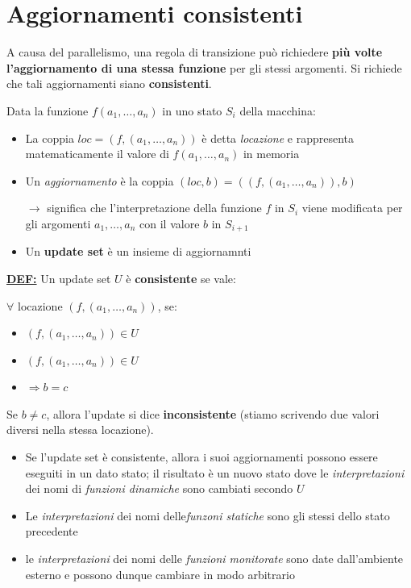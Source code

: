 \section{Aggiornamenti consistenti}
A causa del parallelismo, una regola di transizione può richiedere 
\textbf{più volte l'aggiornamento di una stessa funzione} per gli 
stessi argomenti. Si richiede che tali aggiornamenti siano \textbf{consistenti}.

\noindent Data la funzione $f(a_1, \dots, a_n)$ in uno stato $S_i$ della macchina:
\begin{itemize}
    \item La coppia $loc = (f, (a_1, \dots, a_n))$ è detta \textit{locazione} e rappresenta
    matematicamente il valore di $f(a_1, \dots, a_n)$ in memoria 
    \item Un \textit{aggiornamento} è la coppia $(loc, b)=((f,(a_1,\dots,a_n)), b)$
    
    $\rightarrow$ significa che l'interpretazione della funzione $f$ in $S_i$ viene modificata 
    per gli argomenti $a_1, \dots, a_n$ con il valore $b$ in $S_{i+1}$
    \item Un \textbf{update set} è un insieme di aggiornamnti
\end{itemize}


\noindent \underline{\textbf{DEF:}} Un update set $U$ è \textbf{consistente}
se vale:

\noindent $\forall$ locazione $(f, (a_1, \dots, a_n))$, se:
\begin{itemize}
    \item $(f, (a_1, \dots, a_n)) \in U$
    \item $(f, (a_1, \dots, a_n)) \in U$ 
    \item $\Rightarrow b = c$
\end{itemize}


\noindent Se $b \neq c$, allora l'update si dice \textbf{inconsistente} (stiamo scrivendo 
due valori diversi nella stessa locazione).

\begin{itemize}
    \item Se l'update set è consistente, allora i suoi aggiornamenti possono 
    essere eseguiti in un dato stato; il risultato è un nuovo stato dove le 
    \textit{interpretazioni} dei nomi di \textit{funzioni dinamiche} sono cambiati 
    secondo $U$
    \item Le \textit{interpretazioni} dei nomi delle\textit{funzoni statiche} sono gli stessi 
    dello stato precedente 
    \item le \textit{interpretazioni} dei nomi delle \textit{funzioni monitorate} sono date dall'ambiente esterno 
    e possono dunque cambiare in modo arbitrario
\end{itemize}


